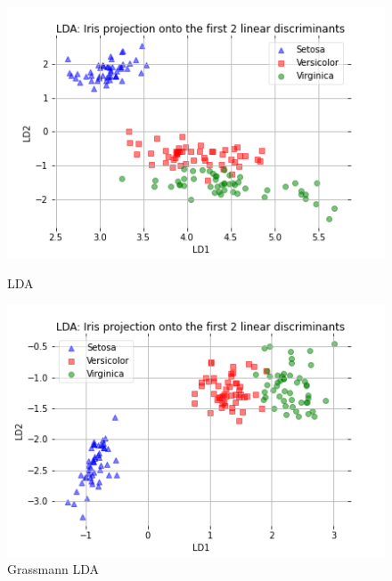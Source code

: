\documentclass[11pt,a4paper]{report}
\begin{document}
  \begin{figure}[h!]    
       
    \includegraphics[width=\linewidth]{LDA.png}    
    \caption{LDA}\label{fig:original}    
  \endminipage\hfill    
    \includegraphics[width=\linewidth]{GrassmannLDA.png}    
    \caption{Grassmann LDA}\label{fig:iter1}    
  \endminipage\hfill 
  \end{figure}
\setcounter{tocdepth}{1} 

 
\end{document}

